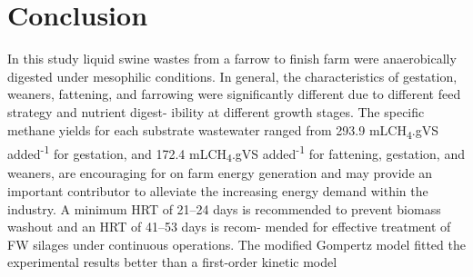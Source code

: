 \section{Conclusion}
In this study liquid swine wastes from a farrow to finish farm were anaerobically digested under mesophilic conditions. In general, the characteristics of gestation, weaners, fattening, and farrowing were significantly different due to different feed strategy and nutrient digest- ibility at different growth stages. The specific methane yields for each substrate wastewater ranged from 293.9 mLCH\textsubscript{4}.gVS added\textsuperscript{-1} for gestation, and 172.4 mLCH\textsubscript{4}.gVS added\textsuperscript{-1} for fattening, gestation, and weaners, are encouraging for on farm energy generation and may provide an important contributor to alleviate the increasing energy demand within the industry. A minimum HRT of 21–24 days is recommended to prevent biomass washout and an HRT of 41–53 days is recom- mended for effective treatment of FW silages under continuous operations. The modified Gompertz model fitted the experimental results better than a first-order kinetic model